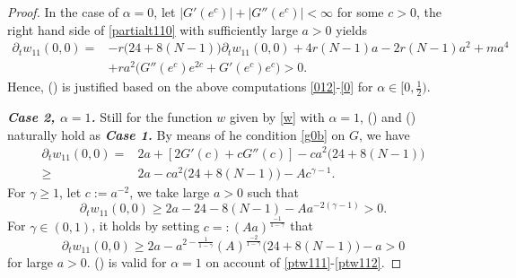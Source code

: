 \documentclass[10pt]{article}         %
\numberwithin{equation}{section}
\begin{document}
\begin{proof}
 In the case of $\alpha=0$, let $|G'(e^c)|+|G''(e^c)|<\infty$ for some $c>0$,  the right hand side of \eqref{partialt110} with sufficiently large $a>0$ yields
\begin{equation}\label{0}
\begin{aligned}
\partial_t w_{11}(0,0)=&-r\big(24+8(N-1)\big)\partial_t w_{11}(0,0)+4r(N-1)a-2r(N-1)a^2+ma^4\\
&+ra^2\big(G''(e^c)e^{2c}+G'(e^c)e^c\big)>0.
\end{aligned}
 \end{equation}
Hence,  (\expandafter{}) is justified based on the above computations \eqref{012}-\eqref{0} for $\alpha\in[0,\frac{1}{2})$.

\noindent\textbf{\emph{Case 2, $\alpha=1$.}} Still for the function $w$  given by \eqref{w} with $\alpha=1$, (\expandafter{}) and (\expandafter{}) naturally hold as \textbf{\emph{Case 1.}}
By means of he condition \eqref{g0b} on $G$, we have 
\[\begin{aligned}
\partial_t w_{11}(0,0)=&2a+[2G'(c)+cG''(c)]-ca^2\big(24+8(N-1)\big)\\
\geq &2a-ca^2\big(24+8(N-1)\big)-Ac^{\gamma-1}.
\end{aligned}\]
 For $\gamma\geq 1$, let $c:=a^{-2}$, we take large $a>0$ such that 
\begin{equation}\label{ptw111}\partial_t w_{11}(0,0)\geq 2a-24-8(N-1)-Aa^{-2(\gamma-1)}>0.\end{equation}
For $\gamma\in(0,1)$, it holds by setting $c=:(Aa)^{\frac{-1}{1-\gamma}}$ that 
\begin{equation}\label{ptw112}\partial_t w_{11}(0,0)\geq2a-a^{2-\frac{1}{1-\gamma}}(A)^{\frac{-2}{1-\gamma}}\big(24+8(N-1)\big)-a>0 \end{equation}
for large $a>0$. (\expandafter{}) is valid for $\alpha=1$ on account of \eqref{ptw111}-\eqref{ptw112}.















\vspace{2mm}


\end{proof}
\end{document}
